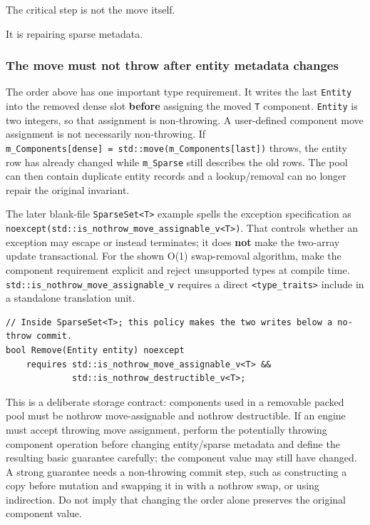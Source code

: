 The critical step is not the move itself.

It is repairing sparse metadata.

\subsubsection{The move must not throw after entity metadata changes}\label{the-move-must-not-throw-after-entity-metadata-changes}

The order above has one important type requirement. It writes the last \texttt{Entity} into the removed dense slot \textbf{before} assigning the moved \texttt{T} component. \texttt{Entity} is two integers, so that assignment is non-throwing. A user-defined component move assignment is not necessarily non-throwing. If \texttt{m\_Components{[}dense{]}\ =\ std::move(m\_Components{[}last{]})} throws, the entity row has already changed while \texttt{m\_Sparse} still describes the old rows. The pool can then contain duplicate entity records and a lookup/removal can no longer repair the original invariant.

The later blank-file \texttt{SparseSet\textless{}T\textgreater{}} example spells the exception specification as \texttt{noexcept(std::is\_nothrow\_move\_assignable\_v\textless{}T\textgreater{})}. That controls whether an exception may escape or instead terminates; it does \textbf{not} make the two-array update transactional. For the shown O(1) swap-removal algorithm, make the component requirement explicit and reject unsupported types at compile time. \texttt{std::is\_nothrow\_move\_assignable\_v} requires a direct \texttt{\textless{}type\_traits\textgreater{}} include in a standalone translation unit.

\begin{verbatim}
// Inside SparseSet<T>; this policy makes the two writes below a no-throw commit.
bool Remove(Entity entity) noexcept
    requires std::is_nothrow_move_assignable_v<T> &&
             std::is_nothrow_destructible_v<T>;
\end{verbatim}

This is a deliberate storage contract: components used in a removable packed pool must be nothrow move-assignable and nothrow destructible. If an engine must accept throwing move assignment, perform the potentially throwing component operation before changing entity/sparse metadata and define the resulting basic guarantee carefully; the component value may still have changed. A strong guarantee needs a non-throwing commit step, such as constructing a copy before mutation and swapping it in with a nothrow swap, or using indirection. Do not imply that changing the order alone preserves the original component value.


